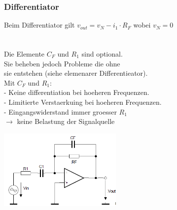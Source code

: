 		\subsubsection{Differentiator }
			\begin{minipage}[b]{12cm}
           		Beim Differentiator gilt $v_{out}=v_N-i_1 \cdot R_F$ wobei
           		$v_N=0$\\ \hspace*{10mm}\\
           		\hspace*{10mm}\\
           		Die Elemente $C_F$ und $R_1$ sind optional. \\
           		Sie beheben jedoch Probleme die ohne \\
           		sie entstehen (siehe elemenarer Differentieator). \\
           		Mit $C_F$ und $R_1$: \\
           		- Keine differentiation bei hoeheren Frequenzen. \\
           		- Limitierte Verstaerkuing bei hoeheren Frequenzen. \\
           		- Eingangswiderstand immer groesser $R_1$ \\ 
           		$\rightarrow$ keine Belastung der Signalquelle
           
           	\end{minipage}
			\begin{minipage}{6cm}
           		\includegraphics[width=6cm]{./bilder/differentiator.png}
           	\end{minipage}

